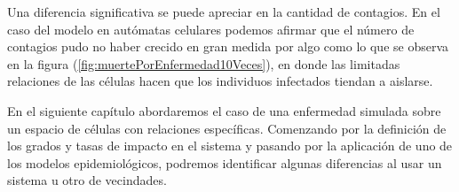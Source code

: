 \begin{example}
Una diferencia significativa se puede apreciar en la cantidad de contagios. En el caso del modelo en autómatas celulares podemos afirmar que el número de contagios pudo no haber crecido en gran medida por algo como lo que se observa en la figura (\ref{fig:muertePorEnfermedad10Veces}), en donde las limitadas relaciones de las células hacen que los individuos infectados tiendan a aislarse.
\end{example}

En el siguiente capítulo abordaremos el caso de una enfermedad simulada sobre un espacio de células con relaciones específicas. Comenzando por la definición de los grados y tasas de impacto en el sistema y pasando por la aplicación de uno de los modelos epidemiológicos, podremos identificar algunas diferencias al usar un sistema u otro de vecindades.
